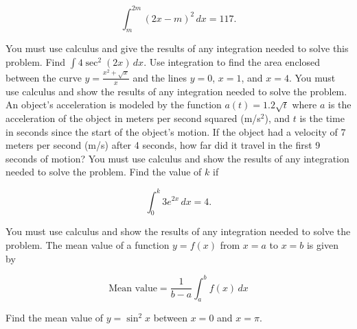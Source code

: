 \documentclass[12pt,addpoints]{exam}
\begin{document}
\begin{questions}
\[
\int_{m}^{2m} (2x - m)^2 \, dx = 117.
\]

You must use calculus and give the results of any integration needed to solve this problem.
\fillwithlines{3cm}
\question[5] Find \(\int 4 \sec^2(2x) \, dx\).
\fillwithlines{3cm}
\question[5] Use integration to find the area enclosed between the curve \( y = \frac{x^2 + \sqrt{x}}{x} \) and the lines \( y = 0 \), \( x = 1 \), and \( x = 4 \). You must use calculus and show the results of any integration needed to solve the problem.
\fillwithlines{3cm}
\question[5] An object's acceleration is modeled by the function \( a(t) = 1.2\sqrt{t} \) where \( a \) is the acceleration of the object in meters per second squared (m/s\(^2\)), and \( t \) is the time in seconds since the start of the object's motion. If the object had a velocity of 7 meters per second (m/s) after 4 seconds, how far did it travel in the first 9 seconds of motion? You must use calculus and show the results of any integration needed to solve the problem.
\fillwithlines{3cm}
\question[5] Find the value of \( k \) if

\[ \int_{0}^{k} 3e^{2x} \, dx = 4. \]

You must use calculus and show the results of any integration needed to solve the problem.
\fillwithlines{3cm}
\question[5] The mean value of a function \( y = f(x) \) from \( x = a \) to \( x = b \) is given by

\[
\text{Mean value} = \frac{1}{b-a} \int_{a}^{b} f(x) \, dx
\]

Find the mean value of \( y = \sin^2 x \) between \( x = 0 \) and \( x = \pi \).


\end{questions}
\end{document}
